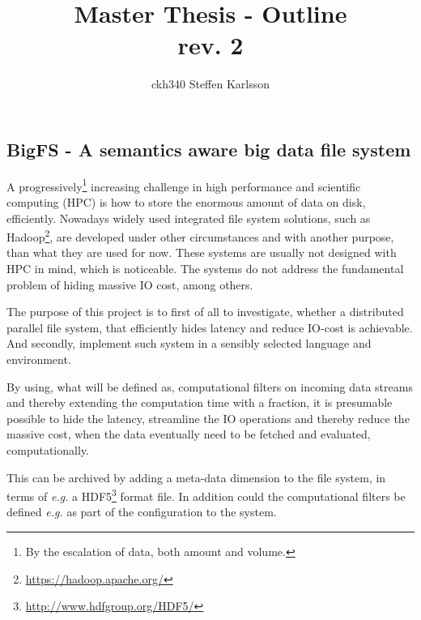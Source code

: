 \documentclass[12pt,a4paper]{article}
\author{ckh340 Steffen Karlsson}
\title{Master Thesis - Outline \\ \small{rev. 2}}
\begin{document}
\maketitle

\subsection*{BigFS - A semantics aware big data file system}

A progressively\footnote{By the escalation of data, both amount and volume.} increasing challenge in high performance and scientific computing (HPC) is how to store the enormous amount of data on disk, efficiently. Nowadays widely used integrated file system solutions, such as Hadoop\footnote{\url{https://hadoop.apache.org/}}, are developed under other circumstances and with another purpose, than what they are used for now. These systems are usually not designed with HPC in mind, which is noticeable. The systems do not address the fundamental problem of hiding massive IO cost, among others.
\newline

The purpose of this project is to first of all to investigate, whether a distributed parallel file system, that efficiently hides latency and reduce IO-cost is achievable. And secondly, implement such system in a sensibly selected language and environment. 
\newline

By using, what will be defined as, computational filters on incoming data streams and thereby extending the computation time with a fraction, it is presumable possible to hide the latency, streamline the IO operations and thereby reduce the massive cost, when the data eventually need to be fetched and evaluated, computationally. 

This can be archived by adding a meta-data dimension to the file system, in terms of \textit{e.g.} a HDF5\footnote{\url{http://www.hdfgroup.org/HDF5/}} format file. In addition could the computational filters be defined \textit{e.g.} as part of the configuration to the system.
\end{document}
